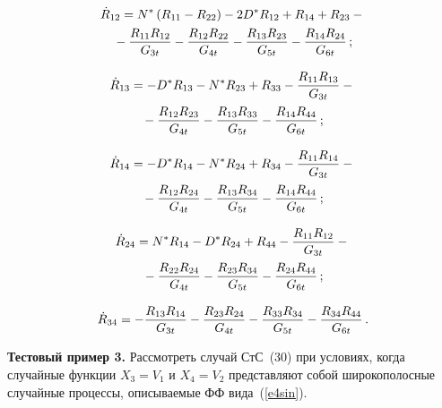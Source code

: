 \begin{multicols}{2}
\vspace*{-12pt}
 
 \noindent
 \begin{multline*}
 \dot R_{12} =N^* \left(R_{11} - R_{22}\right) -2 D^* R_{12} +R_{14}+R_{23} -{}\\
 {}- \fr{R_{11} R_{12}}{G_{3t}} - \fr{R_{12} R_{22}}{G_{4t}} - \fr{R_{13} R_{23}}{G_{5t}}- 
 \fr{R_{14} R_{24}}{G_{6t}}\,;
\end{multline*}

\vspace*{-12pt}

\noindent
\begin{multline*}
\dot R_{13} = - D^* R_{13} - N^* R_{23} +R_{33} - \fr{R_{11} R_{13}}{G_{3t}} -{}\\
{}- \fr{R_{12} R_{23}}{G_{4t}} - \fr{R_{13} R_{33}}{G_{5t}}- \fr{R_{14} R_{44}}{G_{6t}}\,;
\end{multline*}

\vspace*{-12pt}

   \noindent
\begin{multline*}
\dot R_{14} =-D^* R_{14} - N^* R_{24} +R_{34} - \fr{R_{11} R_{14}}{G_{3t}} -{}\\
{}- \fr{R_{12} R_{24}}{G_{4t}} - \fr{R_{13} R_{34}}{G_{5t}}- \fr{R_{14} R_{44}}{G_{6t}}\,;
\end{multline*}

\vspace*{-12pt}

\noindent
\begin{multline*}
\dot R_{24} =N^* R_{14} - D^* R_{24} +R_{44} - \fr{R_{11} R_{12}}{G_{3t}} -{}\\
{}- \fr{R_{22} R_{24}}{G_{4t}} - \fr{R_{23} R_{34}}{G_{5t}}- \fr{R_{24} R_{44}}{G_{6t}}\,;
\end{multline*}

\vspace*{-12pt}

\noindent
\begin{equation*}
\dot R_{34} =- \fr{R_{13} R_{14}}{G_{3t}} - \fr{R_{23} R_{24}}{G_{4t}} - \fr{R_{33} R_{34}}{G_{5t}}- \fr{R_{34} R_{44}}{G_{6t}}\,.
\end{equation*}

\noindent
\textbf{Тестовый пример 3.}
 Рассмотреть случай СтС~(30) при условиях, когда случайные функции 
 $X_3=V_1$ и $X_4=V_2$ представляют собой широкополосные случайные процессы, описываемые ФФ вида~(\ref{e4sin}).


\end{multicols}

